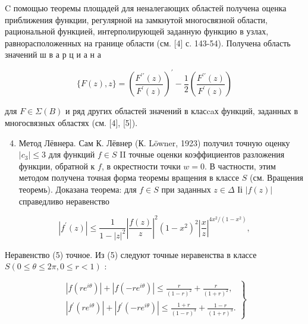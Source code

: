 \documentclass[10pt]{article}
\begin{document}
C помощью теоремы площадей для неналегающих областей получена оценка приближения функции, регулярной на замкнутой многосвязной области, рациональной функцией, интерполирующей заданную функцию в узлах, равнорасположенных на границе области (см. [4] с. 143-54). Получена область значений ш в а р ц и а н а



\[

\{F(z), z\}=\left(\frac{F^{\prime \prime}(z)}{F^{\prime}(z)}\right)^{\prime}-\frac{1}{2}\left(\frac{F^{\prime \prime}(z)}{F^{\prime}(z)}\right)

\]



для $F \in \Sigma(B)$ и ряд других областей значений в класcaх функций, заданных в многосвязных областях (см. [4], [5]).



\begin{enumerate}

  \setcounter{enumi}{3}

  \item Метод Лёвнера. Сам К. Лёвнер (К. Löwner, 1923) получил точную оценку $\left|c_{3}\right| \leqslant 3$ для функций $f \in S$ II точные оценки коэффициентов разложения функции, обратной к $f$, в окрестности точки $w=0$. В частности, этим методом получена точная форма теоремы вращения в классе $S$ (см. Вращения теоремь). Доказана теорема: для $f \in S$ при заданных $z \in \Delta$ Іі $|f(z)|$ справедливо неравенство

\end{enumerate}



\[

\left|f^{\prime}(z)\right| \leqslant \frac{1}{1-|z|^{2}}\left|\frac{f(z)}{z}\right|^{2}\left(1-x^{2}\right)^{2}\left|\frac{x}{z}\right|^{4 x^{2} /\left(1-x^{2}\right)},

\]



Неравенство (5) точное. Из (5) следуют точные неравенства в классе $S(0 \leqslant \theta \leqslant 2 \pi, 0 \leqslant r<1)$ :



\[

\left.\begin{array}{c}

\left|f\left(r e^{i \theta}\right)\right|+\left|f\left(-r e^{i \theta}\right)\right| \leqslant \frac{r}{(1-r)^{2}}+\frac{r}{(1+r)^{2}}, \\

\left|f^{\prime}\left(r e^{i \theta}\right)\right|+\left|f^{\prime}\left(-r e^{i \theta}\right)\right| \leqslant \frac{1+r}{(1-r)^{3}}+\frac{1-r}{(1+r)^{3}} .

\end{array}\right\}

\]
\end{document}
